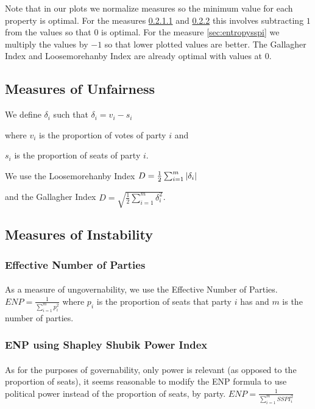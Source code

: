 \documentclass{article}
\begin{document}
Note that in our plots we normalize measures so the minimum value for each property is optimal. For the measures \ref{sec:enp} and \ref{sec:enppower} this involves subtracting $1$ from the values so that $0$ is optimal. For the measure \ref{sec:entropysspi} we multiply the values by $-1$ so that lower plotted values are better. The Gallagher Index and Loosemorehanby Index are already optimal with values at $0$.

\newpage
\subsection{Measures of Unfairness}
We define $\delta_i$ such that
$\delta_i = v_i - s_i$

where $v_i$ is the proportion of votes of party $i$ and

$s_i$ is the proportion of seats of party $i$.

\label{sec:loosemorehanby}
We use the Loosemorehanby Index $D=\frac{1}{2} \sum_{i=1}^m \arrowvert \delta_i \arrowvert$

\label{sec:gallagher}
and the Gallagher Index $D = \sqrt{\frac{1}{2} \sum_{i=1}^m \delta_i^2}$. \cite{gallagher}
\subsection{Measures of Instability}
\subsubsection{Effective Number of Parties}
\paragraph{}
\label{sec:enp}
As a measure of ungovernability, we use the Effective Number of Parties. $ENP=\frac{1}{\sum_{i=1}^m p_i^2}$ \cite{enp} where $p_i$ is the proportion of seats that party $i$ has and $m$ is the number of parties.
\subsubsection{ENP using Shapley Shubik Power Index}\label{sec:enppower}
\paragraph{}
As for the purposes of governability, only power is relevant (as opposed to the proportion of seats), it seems reasonable to modify the ENP formula to use political power instead of the proportion of seats, by party. $ENP=\frac{1}{\sum_{i=1}^m SSPI_i^2}$
\end{document}
